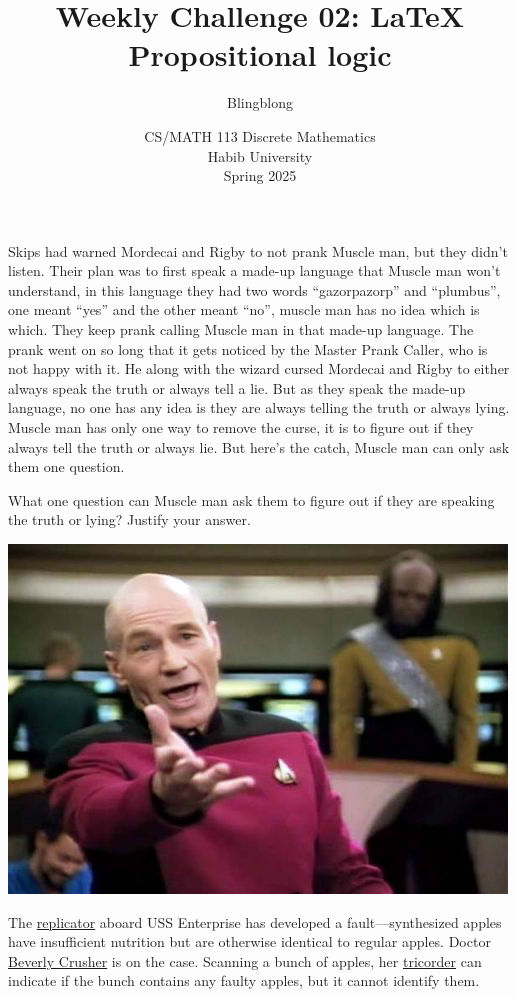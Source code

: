 \documentclass[a4paper]{exam}
\title{Weekly Challenge 02: \LaTeX\; Propositional logic}
\author{Blingblong} %
\date{CS/MATH 113 Discrete Mathematics\\Habib University\\Spring 2025}
\begin{document}
\maketitle

\begin{questions}
  
Skips had warned Mordecai and Rigby to not prank Muscle man, but they didn't listen.
Their plan was to first speak a made-up language that Muscle man won't understand, in this language they had two words ``gazorpazorp'' and ``plumbus'', one meant ``yes'' and the other meant ``no'', muscle man has no idea which is which. They keep prank calling Muscle man in that made-up language.
The prank went on so long that it gets noticed by the Master Prank Caller, who is not happy with it. He along with the wizard cursed Mordecai and Rigby to either always speak the truth or always tell a lie. But as they speak the made-up language, no one has any idea is they are always telling the truth or always lying. Muscle man has only one way to remove the curse, it is to figure out if they always tell the truth or always lie. But here's the catch, Muscle man can only ask them one question. 

What one question can Muscle man ask them to figure out if they are speaking the truth or lying? Justify your answer.
\begin{solution}
\end{solution}

  \begin{minipage}{.3\linewidth}
  \centerline{\includegraphics[width=\textwidth]{picard}}
\end{minipage}
\begin{minipage}{.65\linewidth}
  The \href{https://en.wikipedia.org/wiki/Replicator_(Star_Trek)}{replicator} aboard USS Enterprise has developed a fault---synthesized apples have insufficient nutrition but are otherwise identical to regular apples. Doctor \href{https://memory-alpha.fandom.com/wiki/Beverly_Crusher}{Beverly Crusher} is on the case. Scanning a bunch of apples, her \href{https://en.wikipedia.org/wiki/Medical_tricorder}{tricorder} can indicate if the bunch contains any faulty apples, but it cannot identify them.
\end{minipage}


\end{questions}
\end{document}
